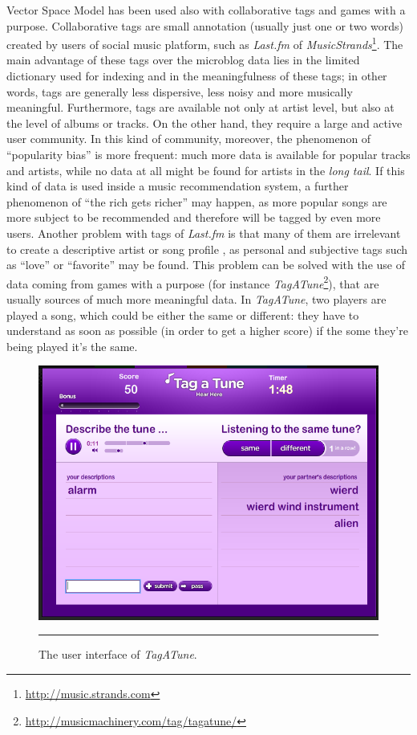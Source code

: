 Vector Space Model has been used also with collaborative tags and games with a purpose. Collaborative tags are small annotation (usually just one or two words) created by users of social music platform, such as \textit{Last.fm} of \textit{MusicStrands}\footnote{\url{http://music.strands.com}}. The main advantage of these tags over the microblog data lies in the limited dictionary used for indexing and in the meaningfulness of these tags; in other words, tags are generally less dispersive, less noisy and more musically meaningful. Furthermore, tags are available not only at artist level, but also at the level of albums or tracks. On the other hand, they require a large and active user community. In this kind of community, moreover, the phenomenon of ``popularity bias'' is more frequent: much more data is available for popular tracks and artists, while no data at all might be found for artists in the \textit{long tail}. If this kind of data is used inside a music recommendation system, a further phenomenon of ``the rich gets richer'' may happen, as more popular songs are more subject to be recommended and therefore will be tagged by even more users. Another problem with tags of \textit{Last.fm} is that many of them are irrelevant to create a descriptive artist or song profile \cite{gomez14}, as personal and subjective tags such as ``love'' or ``favorite'' may be found. This problem can be solved with the use of data coming from games with a purpose (for instance \textit{TagATune}\footnote{\url{http://musicmachinery.com/tag/tagatune/}}), that are usually sources of much more meaningful data. In \textit{TagATune}, two players are played a song, which could be either the same or different: they have to understand as soon as possible (in order to get a higher score) if the some they're being played it's the same. 

\begin{figure}
\centering
    \includegraphics[scale=0.5]{Figures/tagatune.png}
    \rule{20em}{0.5pt}
  \caption[TagATune]{The user interface of \textit{TagATune}.}
  \label{fig:Tagatune}
\end{figure} 

